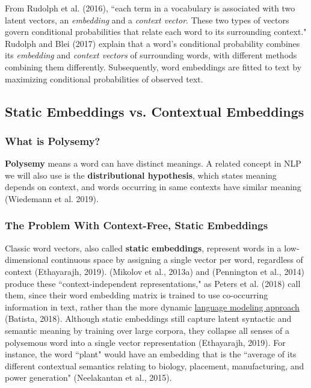 From Rudolph et al. (2016), ``each term in a vocabulary is associated with two latent vectors, an \emph{embedding} and a \emph{context vector}. These two types of vectors govern conditional probabilities that relate each word to its surrounding context." 
Rudolph and Blei (2017) explain that a word's conditional probability combines its \emph{embedding} and \emph{context vectors} of surrounding words, with different methods combining them differently. Subsequently, word embeddings are fitted to text by maximizing conditional probabilities of observed text. 

\subsection{Static Embeddings vs. Contextual Embeddings} \label{sec:StaticVsContextualEmb}

\subsubsection{What is Polysemy?} \label{sec:Polysemy}

\textbf{Polysemy} means a word can have distinct meanings. A related concept in NLP we will also use is the \textbf{distributional hypothesis}, which states meaning depends on context, and words occurring in same contexts have similar meaning (Wiedemann et al. 2019). 

\subsubsection{The Problem With Context-Free, Static Embeddings} \label{sec:ProblemWithStaticEmbs}

Classic word vectors, also called \textbf{static embeddings}, represent words in a low-dimensional continuous space by assigning a single vector per word, regardless of context (Ethayarajh, 2019).  (Mikolov et al., 2013a) and  (Pennington et al., 2014) produce these ``context-independent representations," as Peters et al. (2018) call them, since their word embedding matrix is trained to use co-occurring information in text, rather than the more dynamic \hyperref[sec:LanguageModels]{language modeling approach} (Batista, 2018). Although static embeddings still capture latent syntactic and semantic meaning by training over large corpora, they collapse all senses of a polysemous word into a single vector representation (Ethayarajh, 2019). For instance, the word ``plant" would have an embedding that is the ``average of its different contextual semantics relating to biology, placement, manufacturing, and power generation" (Neelakantan et al., 2015). 



